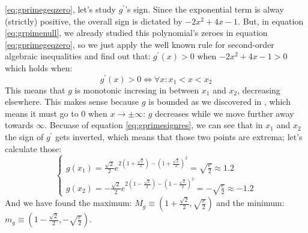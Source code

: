 \ref{eq:gprimegeqzero}, let's study $g^\prime$'s sign.
Since the exponential term is alway (strictly) positive, the overall sign is dictated
by $-2x^2 + 4x - 1$. But, in equation \ref{eq:grpimenull}, we already studied
this polynomial's zeroes in
equation \ref{eq:gprimegeqzero}, so we just apply the well known
rule\sidenote{\label{sn:dice}\snippetquadraticdicerule}
for second-order algebraic inequalities and find out that: $g^\prime(x) > 0$ when
$-2x^2 + 4x - 1 > 0$ which holds when:
\begin{equation}\label{eq:gprimesignres}
g^\prime(x) > 0 \iff \forall x: x_1 < x < x_2
\end{equation}
This means that $g$ is monotonic incresing in between $x_1$ and $x_2$, decreasing
elsewhere. This makes sense because $g$ is bounded as we discovered in
, which means it must go to $0$ when $x \to \pm\infty$:
$g$ decreases while we move further away towards $\infty$.
Becuase of equation \ref{eq:gprimesignres}, we can see that in $x_1$ and $x_2$ the sign
of $g^\prime$ gets inverted, which means that those two points are
extrema; let's calculate those:
\begin{equation*}
    \begin{cases}
        g(x_1) = \frac{\sqrt{2}}{2} e^{2\left( 1 + \frac{\sqrt{2}}{2} \right) - \left( 1 + \frac{\sqrt{2}}{2} \right)^2}
            = \sqrt{\frac{e}{2}} \approx 1.2\\
        g(x_2) = - \frac{\sqrt{2}}{2} e^{2\left( 1 - \frac{\sqrt{2}}{2} \right) - \left( 1 - \frac{\sqrt{2}}{2} \right)^2}
            = - \sqrt{\frac{e}{2}} \approx -1.2
    \end{cases}
\end{equation*}
And we have found the maximum: $M_g \equiv \left( 1 + \frac{\sqrt{2}}{2}, \sqrt{\frac{e}{2}} \right)$ and
the minimum: $m_g \equiv \left( 1 - \frac{\sqrt{2}}{2}, -\sqrt{\frac{e}{2}} \right)$.

